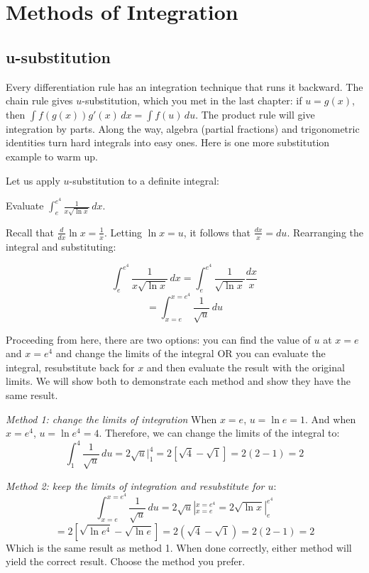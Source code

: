\chapter{Methods of Integration}

\section{u-substitution}
Every differentiation rule has an integration technique that runs it
backward. The chain rule gives $u$-substitution, which you met in the last
chapter: if $u = g(x)$, then $\int f(g(x))g'(x)\,dx = \int f(u)\,du$. The
product rule will give integration by parts. Along the way, algebra
(partial fractions) and trigonometric identities turn hard integrals into
easy ones. Here is one more substitution example to warm up.

Let us apply $u$-substitution to a definite integral:

\begin{Worked}
\begin{Problem}
Evaluate $\int_e^{e^4} \frac{1}{x\sqrt{\ln{x}}}\,dx$.
\end{Problem}
\begin{Solution}
Recall that $\frac{d}{dx}\ln{x} = \frac{1}{x}$. Letting 
$\ln{x} = u$, it follows that $\frac{dx}{x} = du$. Rearranging the integral 
and substituting:

$$\int_e^{e^4} \frac{1}{x\sqrt{\ln{x}}}\,dx = \int_e^{e^4} \frac{1}{\sqrt{\ln{
x}}} \frac{dx}{x}$$
$$=\int_{x=e}^{x=e^4} \frac{1}{\sqrt{u}}\,du$$

Proceeding from here, there are two options: you can find the value of $u$ at 
$x = e$ and $x = e^4$ and change the limits of the integral OR you can 
evaluate the integral, resubstitute back for $x$ and then evaluate the result 
with the original limits. We will show both to demonstrate each method and 
show they have the same result. 

\textit{Method 1: change the limits of integration}
When $x = e$, $u = \ln{e} = 1$. And when $x = e^4$, $u = \ln{e^4} = 4$. 
Therefore, we can change the limits of the integral to:
$$\int_1^4 \frac{1}{\sqrt{u}}\,du = 2\sqrt{u}|_1^4 = 2 \left[ \sqrt{4} - 
\sqrt{1} \right] = 2(2-1) = 2$$

\textit{Method 2: keep the limits of integration and resubstitute for $u$}:
$$\int_{x=e}^{x=e^4} \frac{1}{\sqrt{u}}\,du = 2\sqrt{u}|_{x=e}^{x=e^4} = 2\sqrt{
\ln{x}}|_e^{e^4}$$
$$= 2 \left[ \sqrt{\ln{e^4}} - \sqrt{\ln{e}} \right] = 2(\sqrt{4} - \sqrt{1}) 
= 2(2-1) = 2$$
Which is the same result as method 1. When done correctly, either method will 
yield the correct result. Choose the method you prefer. 
\end{Solution}
\end{Worked}

